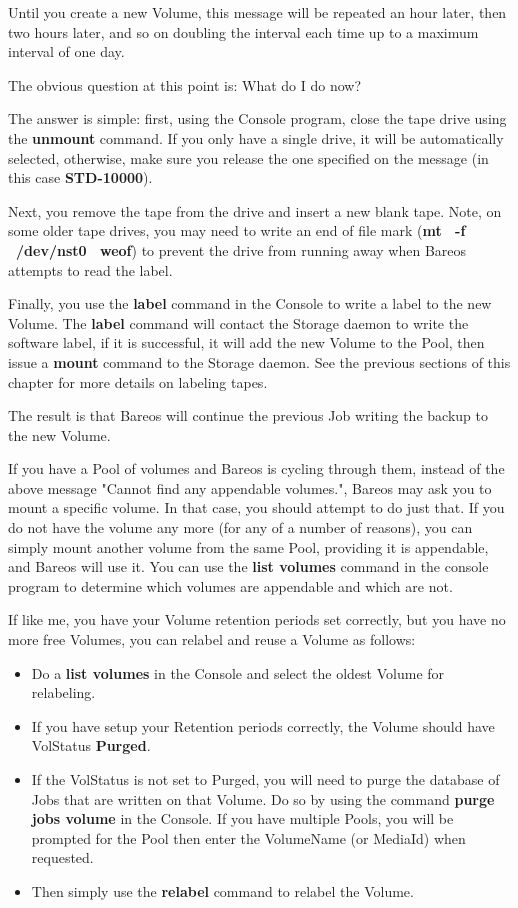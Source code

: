 Until you create a new Volume, this message will be repeated an hour later,
then two hours later, and so on doubling the interval each time up to a
maximum interval of one day.

The obvious question at this point is: What do I do now?

The answer is simple: first, using the Console program, close the tape drive
using the {\bf unmount} command. If you only have a single drive, it will be
automatically selected, otherwise, make sure you release the one specified on
the message (in this case {\bf STD-10000}).

Next, you remove the tape from the drive and insert a new blank tape. Note, on
some older tape drives, you may need to write an end of file mark ({\bf mt \
-f \ /dev/nst0 \ weof}) to prevent the drive from running away when Bareos
attempts to read the label.

Finally, you use the {\bf label} command in the Console to write a label to
the new Volume. The {\bf label} command will contact the Storage daemon to
write the software label, if it is successful, it will add the new Volume to
the Pool, then issue a {\bf mount} command to the Storage daemon. See the
previous sections of this chapter for more details on labeling tapes.

The result is that Bareos will continue the previous Job writing the backup to
the new Volume.

If you have a Pool of volumes and Bareos is cycling through them, instead of
the above message "Cannot find any appendable volumes.", Bareos may ask you
to mount a specific volume. In that case, you should attempt to do just that.
If you do not have the volume any more (for any of a number of reasons), you
can simply mount another volume from the same Pool, providing it is
appendable, and Bareos will use it. You can use the {\bf list volumes} command
in the console program to determine which volumes are appendable and which are
not.

If like me, you have your Volume retention periods set correctly, but you have
no more free Volumes, you can relabel and reuse a Volume as follows:

\begin{itemize}
\item Do a {\bf list volumes} in the Console and select the oldest  Volume for
   relabeling.
\item If you have setup your Retention periods correctly, the  Volume should
   have VolStatus {\bf Purged}.
\item If the VolStatus is not set to Purged, you will need to purge  the
   database of Jobs that are written on that Volume. Do so  by using the command
   {\bf purge jobs volume} in the Console.  If you have multiple Pools, you will
be prompted for the  Pool then enter the VolumeName (or MediaId) when
requested.
\item Then simply use the {\bf relabel} command to relabel the  Volume.
   \end{itemize}

